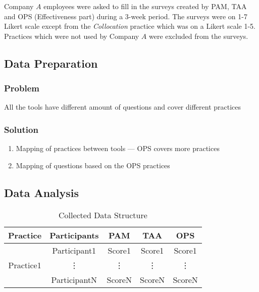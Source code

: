 Company $A$ employees were asked to fill in the surveys created by PAM, TAA and OPS (Effectiveness part) during a 3-week period. The surveys were on 1-7 Likert scale except from the \textit{Collocation} practice which was on a Likert scale 1-5.
Practices which were not used by Company $A$ were excluded from the surveys.

\clearpage


\subsection{Data Preparation}

\subsubsection{Problem}
All the tools have different amount of questions and cover different practices

\subsubsection{Solution}
\begin{enumerate}
	\item Mapping of practices between tools --- OPS covers more practices
	\item Mapping of questions based on the OPS practices
\end{enumerate}

\clearpage


\subsection{Data Analysis}

\begin{table} [H]
	\begin{tabular}{| c | c | c | c | c |} \hline
	\textbf{Practice} & \textbf{Participants} & \textbf{PAM} & \textbf{TAA} & \textbf{OPS} \\ \hline
	\multirow{3}{*}{Practice1} & Participant1 & Score1 & Score1 & Score1 \\ \hhline{~----}
	& \vdots & \vdots & \vdots  & \vdots \\ \hhline{~----}
	& ParticipantN & ScoreN & ScoreN & ScoreN \\ \hline
	\end{tabular}
	\caption{Collected Data Structure}
	\label{table:data_structure}
\end{table}

